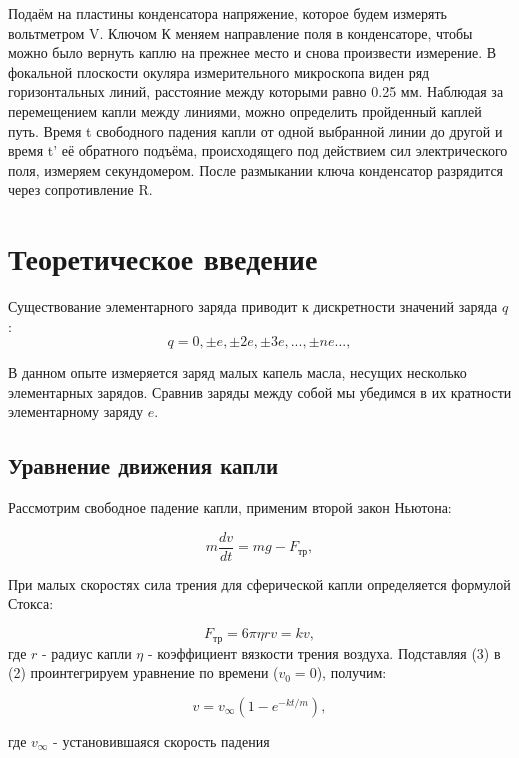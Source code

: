\documentclass{lab}
\begin{document}
Подаём на пластины конденсатора напряжение, которое будем измерять вольтметром V. Ключом К меняем направление поля в конденсаторе, чтобы можно было вернуть каплю на прежнее место и снова произвести измерение. В фокальной плоскости окуляра измерительного микроскопа виден ряд горизонтальных линий, расстояние между которыми равно 0.25 мм. Наблюдая за перемещением капли между линиями, можно определить пройденный каплей путь. Время t свободного падения капли от одной выбранной линии до другой и время t' её обратного подъёма, происходящего под действием сил электрического поля, измеряем секундомером. После размыкании ключа конденсатор разрядится через сопротивление R.
\newpage
\section{Теоретическое введение}
Существование элементарного заряда приводит к дискретности значений заряда $q$:
\begin{equation}
    q = 0, \pm e, \pm 2e, \pm 3e, ..., \pm ne ...,
\end{equation}

В данном опыте измеряется заряд малых капель масла, несущих несколько элементарных зарядов. Сравнив заряды между собой мы убедимся в их кратности элементарному заряду $e$.

\subsection*{Уравнение движения капли}
Рассмотрим свободное падение капли, применим второй закон Ньютона:

\begin{equation}
    m \frac{dv}{dt} = mg - F_{\text{тр}},
\end{equation}

При малых скоростях сила трения для сферической капли определяется формулой Стокса:

\begin{equation}
    F_{\text{тр}} = 6\pi\eta r v = kv,
    \label{eq:friction}
\end{equation}
где $r$ - радиус капли $\eta$ - коэффициент вязкости трения воздуха.
Подставляя (3) в (2) проинтегрируем уравнение по времени ($v_{0} = 0$), получим:

\begin{equation}
    v = v_{\infty}(1 - e^{-kt/m}),
    \label{eq:speed_inf}
\end{equation}

где $v_{\infty}$ - установившаяся скорость падения
\end{document}
